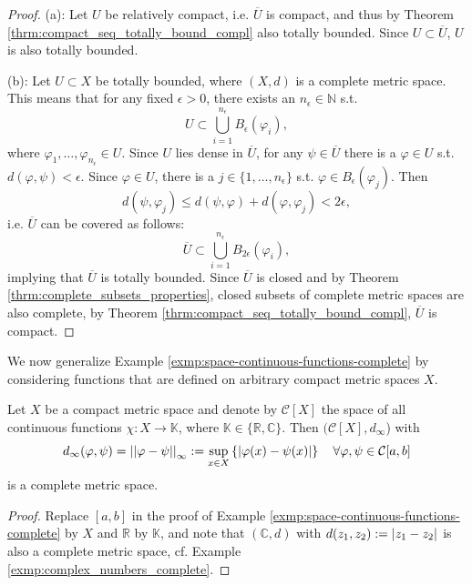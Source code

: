 \begin{proof}
	(a): Let $U$ be relatively compact, i.e. $\overline{U}$ is compact, and thus by Theorem \ref{thrm:compact_seq_totally_bound_compl} also totally bounded. Since $U\subset \overline{U}$, $U$ is also totally bounded.
	
	(b): Let $U\subset X$ be totally bounded, where $(X, d)$ is a complete metric space. This means that for any fixed $\epsilon > 0$, there exists an $n_{\epsilon}\in\mathbb N$ s.t.
	$$U\subset \bigcup_{i=1}^{n_{\epsilon}}B_{\epsilon}(\varphi_i),$$
	where $\varphi_1, \dots, \varphi_{n_{\epsilon}}\in U$. Since $U$ lies dense in $\overline{U}$, for any $\psi\in\overline{U}$ there is a $\varphi\in U$ s.t. $d(\varphi, \psi) < \epsilon$. Since $\varphi\in U$, there is a $j\in\{1, \dots, n_{\epsilon}\}$ s.t. $\varphi\in B_{\epsilon}(\varphi_j)$. Then
	$$d(\psi, \varphi_j) \leq d(\psi, \varphi) + d(\varphi, \varphi_j) < 2\epsilon,$$
	i.e. $\overline{U}$ can be covered as follows:
	$$\overline{U}\subset \bigcup_{i=1}^{n_{\epsilon}}B_{2\epsilon}(\varphi_i),$$ implying that $\overline{U}$ is totally bounded. Since $\overline{U}$ is closed and by Theorem \ref{thrm:complete_subsets_properties}, closed subsets of complete metric spaces are also complete, by Theorem \ref{thrm:compact_seq_totally_bound_compl}, $\overline{U}$ is compact.
\end{proof}

We now generalize Example \ref{exmp:space-continuous-functions-complete} by considering functions that are defined on arbitrary compact metric spaces $X$.

\begin{theorem}
	Let $X$ be a compact metric space and denote by $\mathcal C[X]$ the space of all continuous functions $\chi: X\to\mathbb K$, where $\mathbb K \in \{\mathbb R, \mathbb C\}$. Then $(\mathcal C[X], d_{\infty}$) with $$d_{\infty}(\varphi, \psi) = \left\vert\left\vert \varphi - \psi \right\vert\right\vert_{\infty} := \sup_{x\in X}\left\{ \left\vert \varphi(x) - \psi(x) \right\vert \right\} \quad \forall \varphi, \psi\in\mathcal C[a, b]$$
	is a complete metric space.
\end{theorem}

\begin{proof}
	Replace $[a, b]$ in the proof of Example \ref{exmp:space-continuous-functions-complete} by $X$ and $\mathbb R$ by $\mathbb K$, and note that $(\mathbb C, d)$ with $d(z_1, z_2) := \left\vert z_1 - z_2 \right\vert$ is also a complete metric space, cf. Example \ref{exmp:complex_numbers_complete}.
\end{proof}

